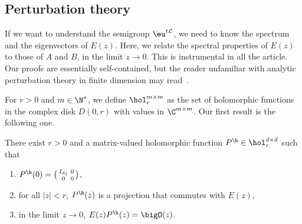 \subsection{Perturbation theory}
\label{subsubsec:PT}

If we want to understand the semigroup $\eu^{t\mathcal L}$, we need to know the spectrum and the eigenvectors of $E(z)$. Here, we relate the spectral properties of $E(z)$ to those of $A$ and $B$, in the limit $z\to 0$. This is instrumental in all the article. Our proofs are essentially self-contained, but the reader unfamiliar with analytic perturbation theory in finite dimension may read~\cite[Ch.\,II, \S1 \& \S2]{kato_1995}.

For $r>0$ and $m \in \N^{*}$, we define $\hol_{r}^{m\times m}$ as the set of holomorphic functions in the complex disk $D(0,r)$ with values in $\C^{m \times m}$. Our first result is the following one.

\begin{prop}\label{th:perturb_hyper}
There exist $r>0$ and a matrix-valued holomorphic function $P^\h\in \hol_{r}^{d\times d}$ such that
\begin{enumerate}
\item \label{th:perturb_hyperi}$P^\h(0) = \big(\begin{smallmatrix}I_{d_1}&0\\0&0 \end{smallmatrix} \big)$,
\item\label{th:perturb_hyperii} for all $|z|<r$, $P^\h(z)$ is a projection that commutes with $E(z)$,
\item\label{th:perturb_hyperiii} in the limit $z\to 0$, $E(z)P^\h(z) = \bigO(z)$.
\end{enumerate}
\end{prop}


